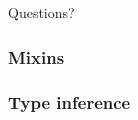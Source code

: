 \documentclass[xcolor=dvipsnames]{beamer}
\begin{document}
\begin{frame}
  \begin{center}
    Questions?
  \end{center}
\end{frame}

\begin{frame}
  \frametitle{Mixins}
  
\end{frame}

\begin{frame}[fragile]
  \frametitle{Type inference}
  
  
\end{frame}
\end{document}
